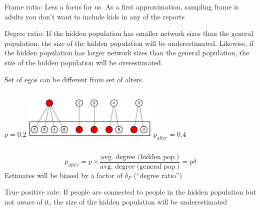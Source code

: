 \documentclass[aspectratio=169]{beamer}
\begin{document}
\begin{frame}

Frame ratio: Less a focus for us.  As a first approximation, sampling frame is adults you don't want to include kids in any of the reports

\end{frame}
\begin{frame}

Degree ratio: If the hidden population has smaller network sizes than the general population, the size of the hidden population will be underestimated.  Likewise, if the hidden population has larger network sizes than the general population, the size of the hidden population will be overestimated.

\end{frame}
\begin{frame}

Set of egos can be different from set of alters.
\vfill
\begin{columns}[c]
\phantom{1234}$p=0.2$
\pause
\includegraphics[height=0.8in]{figures/unfolded_network_slides}
\phantom{123456789123456789101112}
\phantom{1234567891234}$p_{alter}=0.4$
\end{columns}
\vfill
\pause
\begin{equation*}
p_{alter}=p \times \frac{\mbox{avg. degree (hidden pop.)}}{\mbox{avg. degree (general pop.)}}=p \delta
\end{equation*}
\vfill
Estimates will be biased by a factor of $\delta_F$ (``degree ratio'')

\end{frame}
\begin{frame}

True positive rate: If people are connected to people in the hidden population but not aware of it, the size of the hidden population will be underestimated 

\end{frame}
\end{document}
